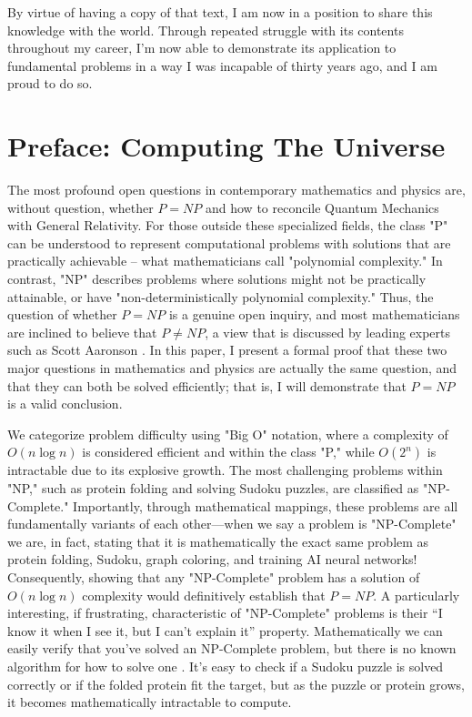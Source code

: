 \documentclass{report}
\begin{document}
By virtue of having a copy of that text, I am now in a position to share this knowledge with the world. Through repeated struggle with its contents throughout my career, I'm now able to demonstrate its application to fundamental problems in a way I was incapable of thirty years ago, and I am proud to do so.

\newpage
\section*{Preface: Computing The Universe}

    The most profound open questions in contemporary mathematics and physics are, without question, whether \(P=NP\) and how to reconcile Quantum Mechanics with General Relativity. For those outside these specialized fields, the class "P" can be understood to represent computational problems with solutions that are practically achievable – what mathematicians call "polynomial complexity." In contrast, "NP" describes problems where solutions might not be practically attainable, or have "non-deterministically polynomial complexity." Thus, the question of whether \(P=NP\) is a genuine open inquiry, and most mathematicians are inclined to believe that \(P \neq NP\), a view that is discussed by leading experts such as Scott Aaronson \cite{Aaronson2013}. In this paper, I present a formal proof that these two major questions in mathematics and physics are actually the same question, and that they can both be solved efficiently; that is, I will demonstrate that \(P=NP\) is a valid conclusion.
    
    We categorize problem difficulty using "Big O" notation, where a complexity of \(O(n \log n)\) is considered efficient and within the class "P," while \(O(2^n)\) is intractable due to its explosive growth. The most challenging problems within "NP," such as protein folding and solving Sudoku puzzles, are classified as "NP-Complete." Importantly, through mathematical mappings, these problems are all fundamentally variants of each other—when we say a problem is "NP-Complete" we are, in fact, stating that it is mathematically the exact same problem as protein folding, Sudoku, graph coloring, and training AI neural networks! Consequently, showing that any "NP-Complete" problem has a solution of \(O(n \log n)\) complexity would definitively establish that \(P=NP\). A particularly interesting, if frustrating, characteristic of "NP-Complete" problems is their “I know it when I see it, but I can't explain it” property. Mathematically we can easily verify that you've solved an NP-Complete problem, but there is no known algorithm for how to solve one \cite{AroraBarak2009}. It's easy to check if a Sudoku puzzle is solved correctly or if the folded protein fit the target, but as the puzzle or protein grows, it becomes mathematically intractable to compute.
    
\end{document}
